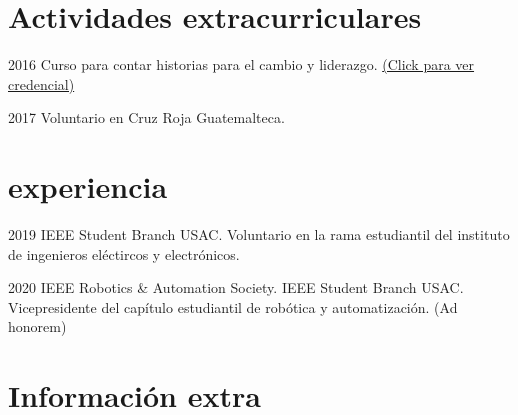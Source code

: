 \documentclass[]{twentysecondcv}
\begin{document}
{%


\section{Actividades extracurriculares}

\begin{twentyshort}

	\twentyitemshort
    	{2016}
    	{Curso para contar historias para el cambio y liderazgo. \href{https://www.coursera.org/account/accomplishments/verify/HG4MHZYP8JXW}{(Click para ver credencial)}}
    
	\twentyitemshort
    	{2017}
    	{Voluntario en Cruz Roja Guatemalteca.}   
    	
\end{twentyshort}



\section{experiencia}

\begin{twenty}

	\twentyitem
    	{2019}
    	{ }
    	{IEEE Student Branch USAC.}
    	{Voluntario en la rama estudiantil del instituto de ingenieros el\'ectircos y electr\'onicos.}
    	
    	
	\twentyitem
    	{2020}
    	{IEEE Robotics \& Automation Society.}
    	{IEEE Student Branch USAC.}
    	{Vicepresidente del cap\'itulo estudiantil de rob\'otica y automatizaci\'on. (Ad honorem)}
    
\end{twenty}

\section{Informaci\'on extra}

}
\end{document}
